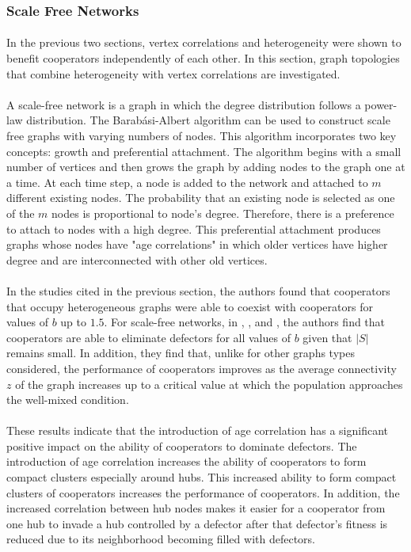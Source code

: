 \documentclass{article}
\begin{document}
	\subsubsection{Scale Free Networks}
	\paragraph{}In the previous two sections, vertex correlations and heterogeneity were shown to benefit cooperators independently of each other.  In this section, graph topologies that combine heterogeneity with vertex correlations are investigated.
	\paragraph{}A scale-free network is a graph in which the degree distribution follows a power-law distribution.  The Barab\'{a}si-Albert algorithm can be used to construct scale free graphs with varying numbers of nodes.  This algorithm incorporates two key concepts: growth and preferential attachment.  The algorithm begins with a small number of vertices and then grows the graph by adding nodes to the graph one at a time.  At each time step, a node is added to the network and attached to $m$ different existing nodes.  The probability that an existing node is selected as one of the $m$ nodes is proportional to node's degree.  Therefore, there is a preference to attach to nodes with a high degree.  This preferential attachment produces graphs whose nodes have "age correlations" in which older vertices have higher degree and are interconnected with other old vertices.
	\paragraph{}In the studies cited in the previous section, the authors found that cooperators that occupy heterogeneous graphs were able to coexist with cooperators for values of $b$ up to $1.5$.  For scale-free networks, in \cite{Pacheco2005}, \cite{Santos2006a}, \cite{Santos2006b} and \cite{Santos2006c}, the authors find that cooperators are able to eliminate defectors for all values of $b$ given that $|S|$ remains small.  In addition, they find that, unlike for other graphs types considered, the performance of cooperators improves as the average connectivity $z$ of the graph increases up to a critical value at which the population approaches the well-mixed condition.
	\paragraph{}These results indicate that the introduction of age correlation has a significant positive impact on the ability of cooperators to dominate defectors.  The introduction of age correlation increases the ability of cooperators to form compact clusters especially around hubs.  This increased ability to form compact clusters of cooperators increases the performance of cooperators.  In addition, the increased correlation between hub nodes makes it easier for a cooperator from one hub to invade a hub controlled by a defector after that defector's fitness is reduced due to its neighborhood becoming filled with defectors.
\end{document}
